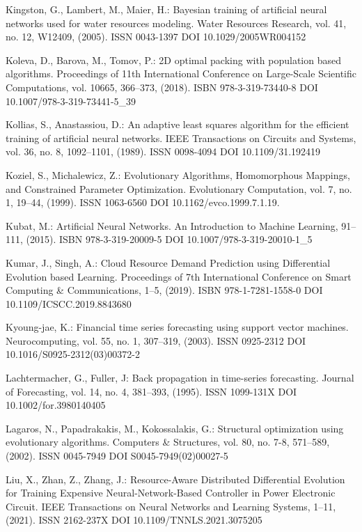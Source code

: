 \begin{thebibliography}{99.}
 Kingston, G., Lambert, M., Maier, H.: Bayesian training of artificial neural networks used for water resources modeling. Water Resources Research, vol. 41, no. 12, W12409, (2005). ISSN 0043-1397 DOI 10.1029/2005WR004152

 Koleva, D., Barova, M., Tomov, P.: 2D optimal packing with population based algorithms. Proceedings of 11th International Conference on Large-Scale Scientific Computations, vol. 10665, 366--373, (2018). ISBN 978-3-319-73440-8 DOI 10.1007/978-3-319-73441-5\_39

 Kollias, S., Anastassiou, D.: An adaptive least squares algorithm for the efficient training of artificial neural networks. IEEE Transactions on Circuits and Systems, vol. 36, no. 8, 1092--1101, (1989). ISSN 0098-4094 DOI 10.1109/31.192419

 Koziel, S., Michalewicz, Z.: Evolutionary Algorithms, Homomorphous Mappings, and Constrained Parameter Optimization. Evolutionary Computation, vol. 7, no. 1, 19--44, (1999). ISSN 1063-6560 DOI 10.1162/evco.1999.7.1.19.

 Kubat, M.: Artificial Neural Networks. An Introduction to Machine Learning, 91--111, (2015). ISBN 978-3-319-20009-5 DOI 10.1007/978-3-319-20010-1\_5

 Kumar, J., Singh, A.: Cloud Resource Demand Prediction using Differential Evolution based Learning. Proceedings of 7th International Conference on Smart Computing \& Communications, 1--5, (2019). ISBN 978-1-7281-1558-0 DOI 10.1109/ICSCC.2019.8843680

 Kyoung-jae, K.: Financial time series forecasting using support vector machines. Neurocomputing, vol. 55, no. 1, 307--319, (2003). ISSN 0925-2312 DOI 10.1016/S0925-2312(03)00372-2

 Lachtermacher, G., Fuller, J: Back propagation in time-series forecasting. Journal of Forecasting, vol. 14, no. 4, 381--393, (1995). ISSN 1099-131X DOI 10.1002/for.3980140405

 Lagaros, N., Papadrakakis, M., Kokossalakis, G.: Structural optimization using evolutionary algorithms. Computers \& Structures, vol. 80, no. 7-8, 571--589, (2002). ISSN 0045-7949 DOI S0045-7949(02)00027-5

 Liu, X., Zhan, Z., Zhang, J.: Resource-Aware Distributed Differential Evolution for Training Expensive Neural-Network-Based Controller in Power Electronic Circuit. IEEE Transactions on Neural Networks and Learning Systems, 1--11, (2021). ISSN 2162-237X DOI 10.1109/TNNLS.2021.3075205


\end{thebibliography}
